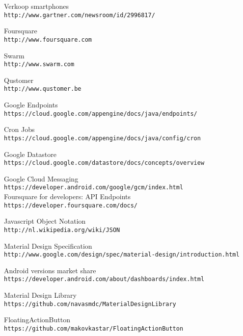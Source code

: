 \begin{thebibliography}{9}

Verkoop smartphones
\\\texttt{http://www.gartner.com/newsroom/id/2996817/}

Foursquare
\\\texttt{http://www.foursquare.com}

Swarm
\\\texttt{http://www.swarm.com}

Qustomer
\\\texttt{http://www.qustomer.be}

Google Endpoints
\\\texttt{https://cloud.google.com/appengine/docs/java/endpoints/}

Cron Jobs
\\\texttt{https://cloud.google.com/appengine/docs/java/config/cron}

Google Datastore
\\\texttt{https://cloud.google.com/datastore/docs/concepts/overview}

Google Cloud Messaging
\\\texttt{https://developer.android.com/google/gcm/index.html}
\\

Foursquare for developers: API Endpoints
\\\texttt{https://developer.foursquare.com/docs/}

Javascript Object Notation
\\\texttt{http://nl.wikipedia.org/wiki/JSON}

Material Design Specification
\\\texttt{http://www.google.com/design/spec/material-design/introduction.html}

Android versions market share
\\\texttt{https://developer.android.com/about/dashboards/index.html}

Material Design Library
\\\texttt{https://github.com/navasmdc/MaterialDesignLibrary}

FloatingActionButton
\\\texttt{https://github.com/makovkastar/FloatingActionButton}


\end{thebibliography}
